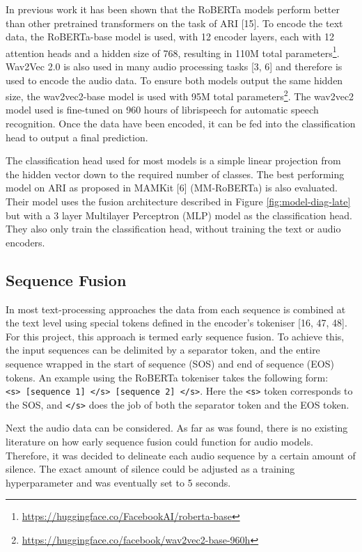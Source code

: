 \documentclass[twocolumn,twoside]{article}
\begin{document}
In previous work it has been shown that the RoBERTa models perform
better than other pretrained transformers on the task of ARI {[}15{]}.
To encode the text data, the RoBERTa-base model is used, with 12 encoder
layers, each with 12 attention heads and a hidden size of 768, resulting
in 110M total parameters\footnote{\url{https://huggingface.co/FacebookAI/roberta-base}}.
Wav2Vec 2.0 is also used in many audio processing tasks {[}3, 6{]}
and therefore is used to encode the audio data. To ensure both models
output the same hidden size, the wav2vec2-base model is used with 95M
total parameters\footnote{\url{https://huggingface.co/facebook/wav2vec2-base-960h}}.
The wav2vec2 model used is fine-tuned on 960 hours of librispeech for
automatic speech recognition. Once the data have been encoded, it can be
fed into the classification head to output a final prediction.

The classification head used for most models is a simple linear
projection from the hidden vector down to the required number of
classes. The best performing model on ARI as proposed in MAMKit {[}6{]}
(MM-RoBERTa) is also evaluated. Their model uses the fusion architecture
described in Figure \ref{fig:model-diag-late} but with a 3 layer
Multilayer Perceptron (MLP) model as the classification head. They also
only train the classification head, without training the text or audio
encoders.

\subsection{Sequence Fusion}\label{sec:seq-fusion}

In most text-processing approaches the data from each sequence is
combined at the text level using special tokens defined in the encoder's
tokeniser {[}16, 47, 48{]}. For this project, this approach
is termed early sequence fusion. To achieve this, the input sequences
can be delimited by a separator token, and the entire sequence wrapped
in the start of sequence (SOS) and end of sequence (EOS) tokens. An
example using the RoBERTa tokeniser takes the following form:
\texttt{\textless{}s\textgreater{}\ {[}sequence\ 1{]}\ \textless{}/s\textgreater{}\ {[}sequence\ 2{]}\ \textless{}/s\textgreater{}}.
Here the \texttt{\textless{}s\textgreater{}} token corresponds to the
SOS, and \texttt{\textless{}/s\textgreater{}} does the job of both the
separator token and the EOS token.

Next the audio data can be considered. As far as was found, there is no
existing literature on how early sequence fusion could function for
audio models. Therefore, it was decided to delineate each audio sequence
by a certain amount of silence. The exact amount of silence could be
adjusted as a training hyperparameter and was eventually set to 5
seconds.
\end{document}
